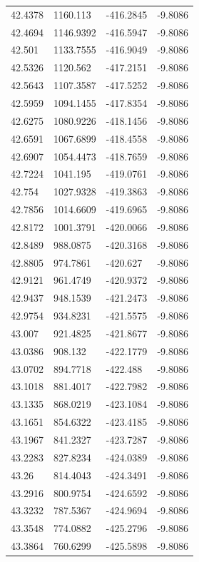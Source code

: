 \begin{table}[H]
\begin{tabular}{llll}
42.4378 & 1160.113 & -416.2845 & -9.8086 \\
42.4694 & 1146.9392 & -416.5947 & -9.8086 \\
42.501 & 1133.7555 & -416.9049 & -9.8086 \\
42.5326 & 1120.562 & -417.2151 & -9.8086 \\
42.5643 & 1107.3587 & -417.5252 & -9.8086 \\
42.5959 & 1094.1455 & -417.8354 & -9.8086 \\
42.6275 & 1080.9226 & -418.1456 & -9.8086 \\
42.6591 & 1067.6899 & -418.4558 & -9.8086 \\
42.6907 & 1054.4473 & -418.7659 & -9.8086 \\
42.7224 & 1041.195 & -419.0761 & -9.8086 \\
42.754 & 1027.9328 & -419.3863 & -9.8086 \\
42.7856 & 1014.6609 & -419.6965 & -9.8086 \\
42.8172 & 1001.3791 & -420.0066 & -9.8086 \\
42.8489 & 988.0875 & -420.3168 & -9.8086 \\
42.8805 & 974.7861 & -420.627 & -9.8086 \\
42.9121 & 961.4749 & -420.9372 & -9.8086 \\
42.9437 & 948.1539 & -421.2473 & -9.8086 \\
42.9754 & 934.8231 & -421.5575 & -9.8086 \\
43.007 & 921.4825 & -421.8677 & -9.8086 \\
43.0386 & 908.132 & -422.1779 & -9.8086 \\
43.0702 & 894.7718 & -422.488 & -9.8086 \\
43.1018 & 881.4017 & -422.7982 & -9.8086 \\
43.1335 & 868.0219 & -423.1084 & -9.8086 \\
43.1651 & 854.6322 & -423.4185 & -9.8086 \\
43.1967 & 841.2327 & -423.7287 & -9.8086 \\
43.2283 & 827.8234 & -424.0389 & -9.8086 \\
43.26 & 814.4043 & -424.3491 & -9.8086 \\
43.2916 & 800.9754 & -424.6592 & -9.8086 \\
43.3232 & 787.5367 & -424.9694 & -9.8086 \\
43.3548 & 774.0882 & -425.2796 & -9.8086 \\
43.3864 & 760.6299 & -425.5898 & -9.8086 \\

\end{tabular}
\end{table}
